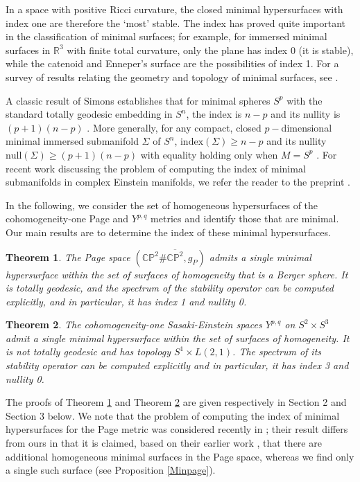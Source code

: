 \documentclass[11pt]{amsart}
\theoremstyle{plain}
\newtheorem{theorem}{Theorem}[section]
\theoremstyle{definition}
\numberwithin{equation}{section}
\begin{document}
In a space with positive Ricci curvature, the closed minimal hypersurfaces with index one are therefore the `most' stable. The index has proved quite important in the classification of minimal surfaces; for example, for immersed minimal surfaces in $\mathbb{R}^3$ with finite total curvature, only the plane has index 0 (it is stable), while the catenoid and Enneper's surface are the possibilities of index 1.  For a survey of results relating the geometry and topology of minimal surfaces, see \cite{survey}. 

A classic result of Simons establishes that for minimal spheres $S^p$ with the standard totally geodesic embedding in $S^n$, the index is $n-p$ and its nullity is $(p+1)(n-p)$ \cite[Prop. 5.1.1]{Simons}. More generally, for any compact, closed $p-$dimensional minimal immersed submanifold $\Sigma$ of $S^n$, $\text{index}(\Sigma) \geq n-p$ and its nullity $\text{null}(\Sigma) \geq (p+1)(n-p)$ with equality holding only when $M = S^p$ \cite[Theorem 5.1.1]{Simons}. For recent work discussing the problem of computing the index of minimal submanifolds in complex Einstein manifolds, we refer the reader to the preprint \cite{Kalafat:2024ctd}.

In the following, we consider the set of homogeneous hypersurfaces of the cohomogeneity-one Page and $Y^{p,q}$ metrics and identify those that are minimal. Our main results are to determine the index of these minimal hypersurfaces. 

\begin{theorem}\label{spectrum:Page}
The Page space $(\mathbb{CP}^2 \# \overline{\mathbb{CP}^2},g_P)$ admits a single minimal hypersurface within the set of surfaces of homogeneity that is a Berger sphere. It is totally geodesic, and the spectrum of the stability operator can be computed explicitly, and in particular, it has index 1 and nullity 0. 
\end{theorem} 

\begin{theorem}\label{Thm2}
The cohomogeneity-one Sasaki-Einstein spaces $Y^{p,q}$ on $S^2 \times S^3$ admit a single minimal hypersurface within the set of surfaces of homogeneity. It is not totally geodesic and has topology $S^1 \times L(2,1)$. The spectrum of its stability operator can be computed explicitly and in particular, it has index 3 and nullity 0. 
\end{theorem} 

The proofs of Theorem \ref{spectrum:Page} and Theorem \ref{Thm2} are given respectively in Section 2 and Section 3 below. We note that the problem of computing the index of minimal hypersurfaces for the Page metric was considered recently in \cite[Theorem 5.1]{Kalafat:2024ctd}; their result differs from ours in that it is claimed, based on their earlier work \cite{KalafatSari}, that there are additional homogeneous minimal surfaces in the Page space, whereas we find only a single such surface (see Proposition \ref{Minpage}).
\end{document}
